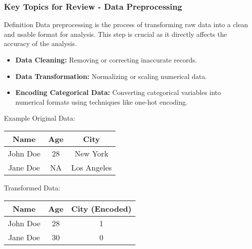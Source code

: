 \documentclass{beamer}
\begin{document}
\begin{frame}[fragile]
    \frametitle{Key Topics for Review - Data Preprocessing}
    \begin{block}{Definition}
        Data preprocessing is the process of transforming raw data into a clean and usable format for analysis. This step is crucial as it directly affects the accuracy of the analysis.
    \end{block}
    
    \begin{itemize}
        \item \textbf{Data Cleaning:} Removing or correcting inaccurate records.
        \item \textbf{Data Transformation:} Normalizing or scaling numerical data.
        \item \textbf{Encoding Categorical Data:} Converting categorical variables into numerical formats using techniques like one-hot encoding.
    \end{itemize}

    \begin{block}{Example}
        Original Data:
        \begin{center}
        \begin{tabular}{|c|c|c|}
        \hline
        Name      & Age & City      \\
        \hline
        John Doe & 28  & New York  \\
        Jane Doe & NA  & Los Angeles \\
        \hline
        \end{tabular}
        \end{center}
        
        Transformed Data:
        \begin{center}
        \begin{tabular}{|c|c|c|}
        \hline
        Name      & Age & City (Encoded) \\
        \hline
        John Doe & 28  & 1              \\
        Jane Doe & 30  & 0              \\
        \hline
        \end{tabular}
        \end{center}
    \end{block}
\end{frame}
\end{document}
